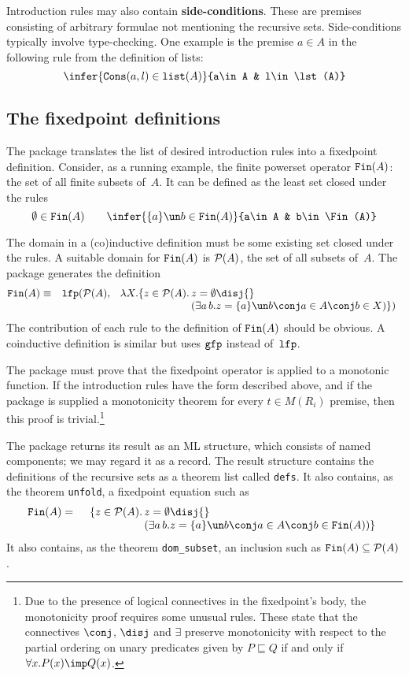 Introduction rules may also contain {\bf side-conditions}.  These are
premises consisting of arbitrary formulae not mentioning the recursive
sets. Side-conditions typically involve type-checking.  One example is the
premise $a\in A$ in the following rule from the definition of lists:
\[ \infer{\Cons(a,l)\in\lst(A)}{a\in A & l\in\lst(A)} \]

\subsection{The fixedpoint definitions}
The package translates the list of desired introduction rules into a fixedpoint
definition.  Consider, as a running example, the finite powerset operator
$\hbox{\tt Fin}(A)$: the set of all finite subsets of~$A$.  It can be
defined as the least set closed under the rules
\[  \emptyset\in\Fin(A)  \qquad 
    \infer{\{a\}\un b\in\Fin(A)}{a\in A & b\in\Fin(A)} 
\]

The domain in a (co)inductive definition must be some existing set closed
under the rules.  A suitable domain for $\hbox{\tt Fin}(A)$ is ${\cal P}(A)$, the set of all
subsets of~$A$.  The package generates the definition
\begin{eqnarray*}
  \Fin(A) & \equiv &  \lfp(\pow(A), \;
  \begin{array}[t]{r@{\,}l}
      \lambda X. \{z\in\pow(A). & z=\emptyset \disj{} \\
                  &(\exists a\,b. z=\{a\}\un b\conj a\in A\conj b\in X)\})
  \end{array}
\end{eqnarray*} 
The contribution of each rule to the definition of $\hbox{\tt Fin}(A)$ should be
obvious.  A coinductive definition is similar but uses $\hbox{\tt gfp}$ instead
of~$\hbox{\tt lfp}$.

The package must prove that the fixedpoint operator is applied to a
monotonic function.  If the introduction rules have the form described
above, and if the package is supplied a monotonicity theorem for every
$t\in M(R_i)$ premise, then this proof is trivial.\footnote{Due to the
  presence of logical connectives in the fixedpoint's body, the
  monotonicity proof requires some unusual rules.  These state that the
  connectives $\conj$, $\disj$ and $\exists$ preserve monotonicity with respect
  to the partial ordering on unary predicates given by $P\sqsubseteq Q$ if and
  only if $\forall x.P(x)\imp Q(x)$.}

The package returns its result as an ML structure, which consists of named
components; we may regard it as a record.  The result structure contains
the definitions of the recursive sets as a theorem list called {\tt defs}.
It also contains, as the theorem {\tt unfold}, a fixedpoint equation such
as
\begin{eqnarray*}
  \Fin(A) & = &
  \begin{array}[t]{r@{\,}l}
     \{z\in\pow(A). & z=\emptyset \disj{} \\
             &(\exists a\,b. z=\{a\}\un b\conj a\in A\conj b\in \Fin(A))\}
  \end{array}
\end{eqnarray*}
It also contains, as the theorem {\tt dom\_subset}, an inclusion such as 
$\hbox{\tt Fin}(A)\subseteq{\cal P}(A)$.


